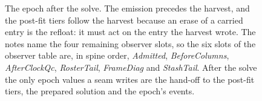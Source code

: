 \documentclass[main.tex]{subfiles}
\begin{document}
\begin{figure}[tbp]
{}
\caption{The epoch after the solve. The emission precedes the harvest, and the
post-fit tiers follow the harvest because an erase of a carried entry is the
refloat: it must act on the entry the harvest wrote. The notes name the four
remaining observer slots, so the six slots of the observer table are, in spine
order, \emph{Admitted}, \emph{BeforeColumns}, \emph{AfterClockQc},
\emph{RosterTail}, \emph{FrameDiag} and \emph{StashTail}. After the solve the only
epoch values a seam writes are the hand-off to the post-fit tiers, the prepared
solution and the epoch's events.}
\label{fig:net-spine-post}
\end{figure}
\end{document}
